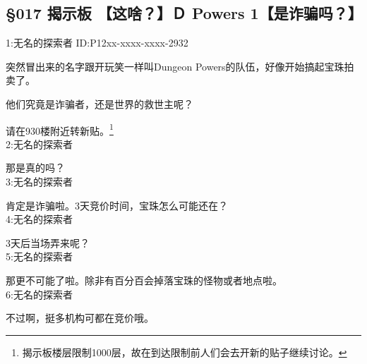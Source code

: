 \subsection{§017 揭示板 【这啥？】Ｄ Powers 1【是诈骗吗？】}

1:无名的探索者 ID:P12xx-xxxx-xxxx-2932

突然冒出来的名字跟开玩笑一样叫Dungeon Powers的队伍，好像开始搞起宝珠拍卖了。

他们究竟是诈骗者，还是世界的救世主呢？

请在930楼附近转新贴。\footnote{揭示板楼层限制1000层，故在到达限制前人们会去开新的贴子继续讨论。}\\

2:无名的探索者

那是真的吗？\\

3:无名的探索者

肯定是诈骗啦。3天竞价时间，宝珠怎么可能还在？\\

4:无名的探索者

3天后当场弄来呢？\\

5:无名的探索者

那更不可能了啦。除非有百分百会掉落宝珠的怪物或者地点啦。\\

6:无名的探索者

不过啊，挺多机构可都在竞价哦。\\

